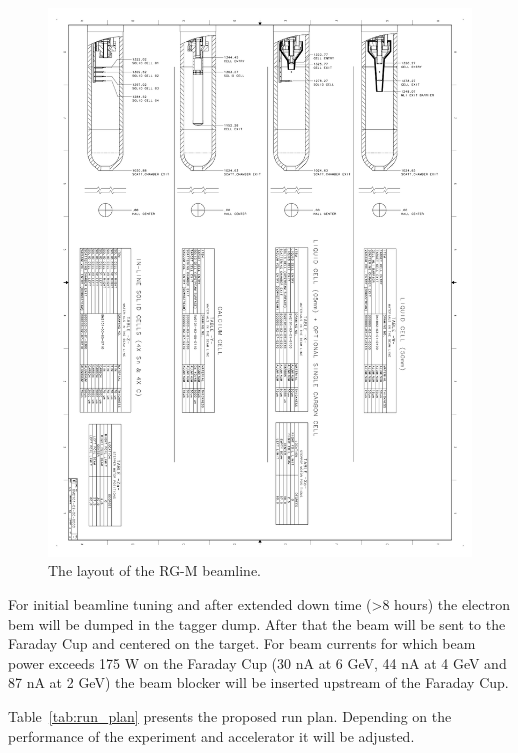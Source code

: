 \documentclass[12pt]{article}
\begin{document}
\begin{figure}[hbt]
\vspace{-2cm}
\begin{center}
\includegraphics[width=6in]{rgm_beam_page4.pdf}
\end{center}
\caption{ \label{fig:beamline4} 
The layout of the RG-M beamline. }
\end{figure}


For initial beamline tuning and after extended down time (>8 hours) the electron bem will be dumped in the tagger dump. After that the beam will be sent to the Faraday Cup and centered on the target.  For beam currents for which beam power exceeds 175 W on the Faraday Cup (30 nA at 6 GeV, 44 nA at 4 GeV and 87 nA at 2 GeV) the beam blocker will be inserted upstream of the Faraday Cup.

Table~\ref{tab:run_plan} presents the proposed run plan. Depending on the performance of the experiment and accelerator it will be adjusted.
\end{document}
